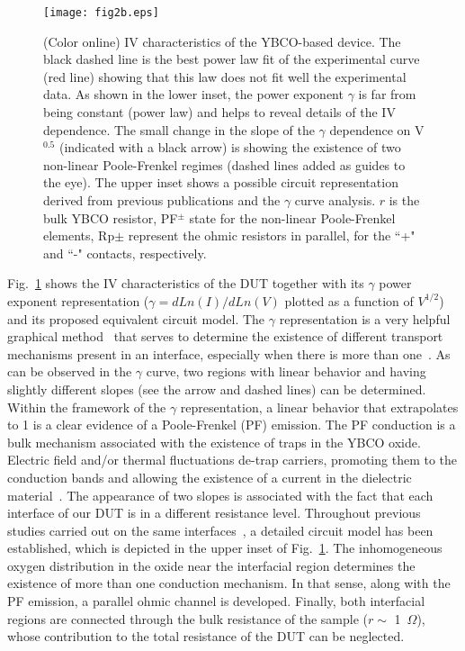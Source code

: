 \documentclass[square,aip,preprint,showkeys,superscriptaddress]{revtex4}
\begin{document}
\begin{figure} [h]
	\vspace{0mm}
	\centerline{\texttt{[image: fig2b.eps]}}
	\vspace{-0mm}\caption{(Color online) IV characteristics of the YBCO-based device. The black dashed line is the best power law fit of the experimental curve (red line) showing that this law does not fit well the experimental data. As shown in the lower inset, the power exponent $\gamma$ is far from being constant (power law) and helps to reveal details of the IV dependence. The small change in the slope of the $\gamma$ dependence on V$^{0.5}$ (indicated with a black arrow) is showing the existence of two non-linear Poole-Frenkel regimes (dashed lines added as guides to the eye). The upper inset shows a possible circuit representation derived from previous publications and the $\gamma$ curve analysis. $r$ is the bulk YBCO resistor, PF$^{\pm}$ state for the non-linear Poole-Frenkel elements, Rp${\pm}$ represent the ohmic resistors in parallel, for the ``+" and ``-" contacts, respectively. } \vspace{-0mm}
	\label{fig:IV_LBT}
\end{figure}


Fig.~\ref{fig:IV_LBT} shows the IV characteristics of the DUT together with its $\gamma$ power exponent representation ($\gamma=dLn(I)/dLn(V)$ plotted as a function of $V^{1/2}$) and its proposed equivalent circuit model.  The $\gamma$ representation is a very helpful graphical method~\cite{Acha17} that serves to determine the existence of different transport mechanisms present in an interface, especially when there is more than one~\cite{Acha16,Acevedo17,Ghenzi19}. As can be observed in the $\gamma$ curve, two regions with linear behavior and having slightly different slopes (see the arrow and dashed lines) can be determined. Within the framework of the $\gamma$ representation, a linear behavior that extrapolates to 1 is a clear evidence of a Poole-Frenkel (PF) emission. The PF conduction is a bulk mechanism associated with the existence of traps in the YBCO oxide. Electric field and/or thermal fluctuations de-trap carriers, promoting them to the conduction bands and allowing the existence of a current in the dielectric material~\cite{Sze06,Chiu14}.  The appearance of two slopes is associated with the fact that each interface of our DUT is in a different resistance level. Throughout previous studies carried out on the same interfaces~\cite{Schulman12,Schulman13,Schulman15,Lanosa20}, a detailed circuit model has been established, which is depicted in the upper inset of Fig.~\ref{fig:IV_LBT}. The inhomogeneous oxygen distribution in the oxide near the interfacial region determines the existence of more than one conduction mechanism. In that sense, along with the PF emission, a parallel ohmic channel is developed. Finally, both interfacial regions are connected through the bulk resistance of the sample ($r \sim$ 1~$\Omega$), whose contribution to the total resistance of the DUT can be neglected. \\
\end{document}
